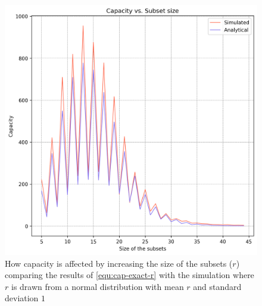     \begin{figure}%
        \centering
        \includegraphics[scale=0.83]{figures/cap-vs-r-bounded-exact-1.png}
        \caption[Capacity vs. Size of the subsets ($r$)]{How capacity is affected by increasing the size of the subsets ($r$) comparing the results of \ref{equ:cap-exact-r} with the simulation where $r$ is drawn from a normal distribution with mean $r$ and standard deviation $1$}
        \label{figure:cap-vs-r-bounded-exact-1}
        \end{figure}

